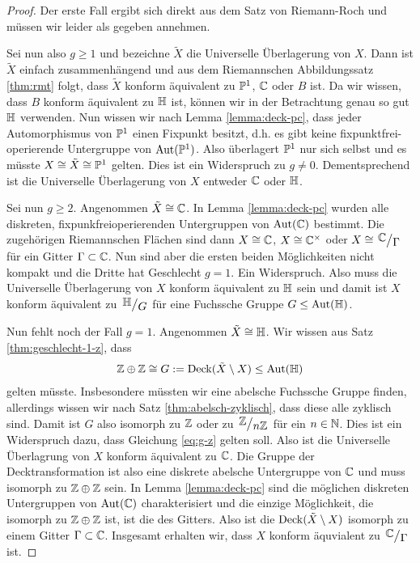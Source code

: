 \begin{proof}
  Der erste Fall ergibt sich direkt aus dem Satz von Riemann-Roch
  \cite[Kor. 16.13]{For} und müssen wir leider als gegeben annehmen.

  Sei
  nun also $g \geq 1$ und bezeichne $\tilde X$ die Universelle
  Überlagerung von $X$. Dann ist $\tilde X$ einfach zusammenhängend
  und aus dem Riemannschen Abbildungssatz \ref{thm:rmt} folgt, dass
  $\tilde X$ konform äquivalent zu $\P^1$, $\C$ oder $B$ ist. Da wir
  wissen, dass $B$ konform äquivalent zu $\h$ ist, können wir in der
  Betrachtung genau so gut $\h$ verwenden. Nun wissen wir nach Lemma
  \ref{lemma:deck-pc}, dass jeder Automorphismus von $\P^1$ einen
  Fixpunkt besitzt, d.h. es gibt keine fixpunktfrei-operierende
  Untergruppe von $\Aut(\P^1)$. Also überlagert $\P^1$ nur sich
  selbst und es müsste $X \cong \tilde X \cong \P^1$ gelten. Dies ist
  ein Widerspruch zu $g \neq 0$. Dementsprechend ist die Universelle Überlagerung
  von $X$ entweder $\C$ oder $\h$.

  Sei nun $g \geq 2$. Angenommen $\tilde X \cong \C$. In Lemma
  \ref{lemma:deck-pc} wurden alle diskreten, fixpunkfreioperierenden
  Untergruppen von $\Aut(\C)$ bestimmt. Die zugehörigen Riemannschen
  Flächen sind dann $X \cong \C$, $X \cong \C^\times$ oder $X \cong
  \quot{\C}{\Gamma}$ für ein Gitter $\Gamma \subset \C$. Nun sind aber
  die ersten beiden Möglichkeiten nicht kompakt und die Dritte hat
  Geschlecht $g =1$. Ein Widerspruch. Also muss die Universelle
  Überlagerung von $X$ konform äquivalent zu $\h$ sein und damit ist
  $X$ konform äquivalent zu $\quot{\h}{G}$ für eine Fuchssche Gruppe $G
  \leq \Aut(\h)$.

  Nun fehlt noch der Fall $g = 1$. Angenommen $\tilde X \cong \h$. Wir
  wissen aus Satz \ref{thm:geschlecht-1-z}, dass
  \begin{align}
    \label{eq:g-z}
    \Z \oplus \Z \cong G := \Deck(\tilde X \setminus X) \leq \Aut(\h)
  \end{align}
  gelten müsste. Insbesondere müssten wir eine abelsche Fuchssche
  Gruppe finden, allerdings wissen wir nach Satz
  \ref{thm:abelsch-zyklisch}, dass diese alle zyklisch sind. Damit ist
  $G$ also isomorph zu $\Z$ oder zu $\quot{\Z}{n\Z}$ für ein $n \in
  \N$. Dies ist ein Widerspruch dazu, dass Gleichung \eqref{eq:g-z}
  gelten soll. Also ist die Universelle Überlagrung von $X$ konform
  äquivalent zu $\C$. Die Gruppe der Decktransformation ist also eine
  diskrete abelsche Untergruppe von $\C$ und muss isomorph zu $\Z
  \oplus \Z$ sein. In Lemma \ref{lemma:deck-pc} sind die möglichen diskreten
  Untergruppen von $\Aut(\C)$ charakterisiert und die einzige Möglichkeit, die
  isomorph zu $\Z \oplus \Z$ ist, ist die des Gitters. Also ist die
  $\Deck(\tilde X \setminus X)$ isomorph zu einem Gitter $\Gamma
  \subset \C$. Insgesamt erhalten wir, dass $X$ konform äquvialent zu
  $\quot{\C}{\Gamma}$ ist.
\end{proof}

